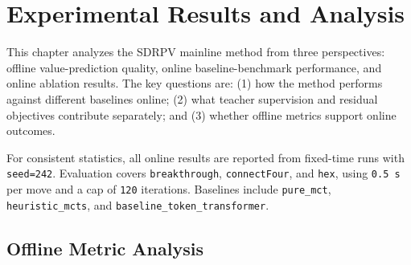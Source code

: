 

\chapter{Experimental Results and Analysis}
\setcounter{figure}{0}
\setcounter{equation}{0}
\renewcommand{\thefigure}{\thechapter-\arabic{figure}}
\renewcommand{\theequation}{\thechapter-\arabic{equation}}


This chapter analyzes the SDRPV mainline method from three perspectives: offline value-prediction quality, online baseline-benchmark performance, and online ablation results. The key questions are: (1) how the method performs against different baselines online; (2) what teacher supervision and residual objectives contribute separately; and (3) whether offline metrics support online outcomes.


For consistent statistics, all online results are reported from fixed-time runs with \texttt{seed=242}. Evaluation covers \texttt{breakthrough}, \texttt{connectFour}, and \texttt{hex}, using \texttt{0.5 s} per move and a cap of \texttt{120} iterations. Baselines include \texttt{pure_mct}, \texttt{heuristic_mcts}, and \texttt{baseline_token_transformer}.


\section{Offline Metric Analysis}


